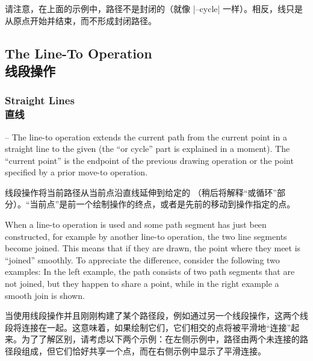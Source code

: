 请注意，在上面的示例中，路径不是封闭的（就像 |--cycle| 一样）。相反，线只是从原点开始并结束，而不形成封闭路径。


\subsection{The Line-To Operation\\线段操作}

\subsubsection{Straight Lines\\直线}

\begin{pathoperation}{--}{}
    The line-to operation extends the current path from the current point in a
    straight line to the given  (the ``or cycle'' part is
    explained in a moment). The ``current point'' is the endpoint of the
    previous drawing operation or the point specified by a prior move-to
    operation.

    线段操作将当前路径从当前点沿直线延伸到给定的 （稍后将解释“或循环”部分）。“当前点”是前一个绘制操作的终点，或者是先前的移动到操作指定的点。


    When a line-to operation is used and some path segment has just been
    constructed, for example by another line-to operation, the two line
    segments become joined. This means that if they are drawn, the point where
    they meet is ``joined'' smoothly. To appreciate the difference, consider
    the following two examples: In the left example, the path consists of two
    path segments that are not joined, but they happen to share a point, while
    in the right example a smooth join is shown.

    当使用线段操作并且刚刚构建了某个路径段，例如通过另一个线段操作，这两个线段将连接在一起。这意味着，如果绘制它们，它们相交的点将被平滑地“连接”起来。为了了解区别，请考虑以下两个示例：在左侧示例中，路径由两个未连接的路径段组成，但它们恰好共享一个点，而在右侧示例中显示了平滑连接。


\begin{codeexample}[]
\end{codeexample}


\end{pathoperation}
